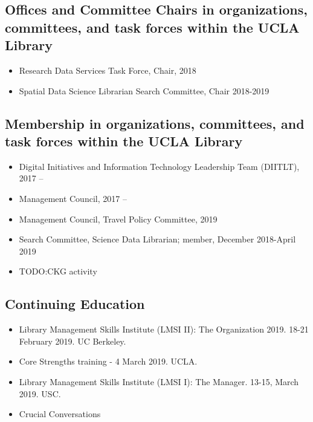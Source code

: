 
\subsection{Offices and Committee Chairs in organizations, committees, and task forces within the UCLA Library}

\begin{itemize}[label={}]
  \item Research Data Services Task Force, Chair, 2018
  \item Spatial Data Science Librarian Search Committee, Chair 2018-2019
\end{itemize}


\subsection{Membership in organizations, committees, and task forces within the UCLA Library}

\begin{itemize}[label={}]
    \item Digital Initiatives and Information Technology Leadership Team (DIITLT), 2017 --
    \item Management Council, 2017 --
    \item Management Council, Travel Policy Committee, 2019
    \item Search Committee, Science Data Librarian; member, December 2018-April 2019
    \item TODO:CKG activity 
\end{itemize}

\subsection{Continuing Education}


\begin{itemize}[label={}]
  \item Library Management Skills Institute (LMSI II): The Organization 2019. 18-21 February 2019. UC Berkeley.
  \item Core Strengths training - 4 March 2019. UCLA.
  \item Library Management Skills Institute (LMSI I): The Manager. 13-15, March 2019. USC.
  \item Crucial Conversations
\end{itemize}

